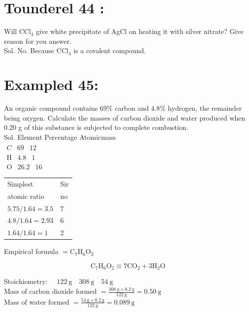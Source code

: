 \documentclass[10pt]{article}
\begin{document}
\section*{Tounderel 44 :}
Will $\mathrm{CCl}_{4}$ give white precipitate of AgCl on heating it with silver nitrate? Give reason for you answer.\\
Sol. No. Because $\mathrm{CCl}_{4}$ is a covalent compound.

\section*{Exampled 45:}
An organic compound contains $69 \%$ carbon and $4.8 \%$ hydrogen, the remainder being oxygen. Calculate the masses of carbon dioxide and water produced when 0.20 g of this substance is subjected to complete combustion.\\
Sol. Element Percentage Atomicmass\\
$\begin{array}{lll}C & 69 & 12\end{array}$\\
$\begin{array}{lll}\mathrm{H} & 4.8 & 1\end{array}$\\
$\begin{array}{lll}\mathrm{O} & 26.2 & 16\end{array}$

\begin{center}
\begin{tabular}{ll}
Simplest & Sir \\
atomic ratio & no \\
$5.75 / 1.64=3.5$ & 7 \\
$4.8 / 1.64=2.93$ & 6 \\
$1.64 / 1.64=1$ & 2 \\
\end{tabular}
\end{center}

Empirical formula $=\mathrm{C}_{7} \mathrm{H}_{6} \mathrm{O}_{2}$

$$
\mathrm{C}_{7} \mathrm{H}_{6} \mathrm{O}_{2} \equiv 7 \mathrm{CO}_{2}+3 \mathrm{H}_{2} \mathrm{O}
$$

Stoichiometry: $\quad 122 \mathrm{~g} \quad 308 \mathrm{~g} \quad 54 \mathrm{~g}$\\
Mass of carbon dioxide formed $=\frac{308 \mathrm{~g} \times 0.2 \mathrm{~g}}{122 \mathrm{~g}}=0.50 \mathrm{~g}$\\
Mass of water formed $=\frac{54 \mathrm{~g} \times 0.2 \mathrm{~g}}{122 \mathrm{~g}}=0.089 \mathrm{~g}$
\end{document}
